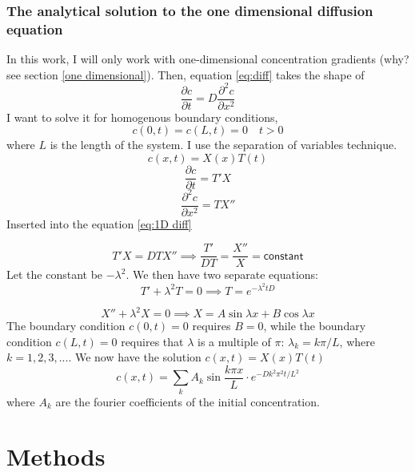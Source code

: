 \documentclass{article}
\begin{document}
\subsubsection{The analytical solution to the one dimensional diffusion equation}\label{analytical solution}
In this work, I will only work with one-dimensional concentration gradients (why? see section \ref{one dimensional}). Then, equation \ref{eq:diff} takes the shape of
\begin{equation}\label{eq:1D diff}
\frac{\partial c}{\partial t} = D\frac{\partial^2 c}{\partial x^2}
\end{equation}
I want to solve it for homogenous boundary conditions, 
$$c(0,t) = c(L,t)=0 \quad t>0$$ where $L$ is the length of the system. I use the separation of variables technique. 
\begin{equation*}
c(x,t) = X(x)T(t)
\end{equation*}
\begin{equation*}
\frac{\partial c}{\partial t} = T'X
\end{equation*}
\begin{equation*}
\frac{\partial^2 c}{\partial x^2} = TX''
\end{equation*}
Inserted into the equation \ref{eq:1D diff}

\begin{equation*}
T'X  = DTX''\implies \frac{T'}{DT} = \frac{X''}{X} =\mathsf{ constant}
\end{equation*}
Let the constant be $-\lambda ^2$. We then have two separate equations:
\begin{equation*}
T' + \lambda^2 T = 0 \implies T=e^{-\lambda^2 tD}
\end{equation*}

\begin{equation*}
X'' + \lambda^2X = 0 \implies X=A \sin \lambda x + B\cos \lambda x
\end{equation*}
The boundary condition $c(0,t) = 0$ requires $B=0$, while the boundary condition $c(L,t)=0$ requires that $\lambda$ is a multiple of $\pi$: $\lambda_k = k\pi /L$, where $k = 1,2,3,...$. 
We now have the solution $c(x,t)=X(x)T(t)$
\begin{equation}\label{eq:c(x,t)}
c(x,t) = \sum_k A_k \sin \frac{k \pi x}{L}\cdot e^{-Dk^2\pi^2 t /L^2}
\end{equation}
where $A_k$ are the fourier coefficients of the initial concentration.


\section{Methods}
\end{document}
